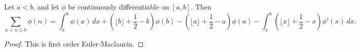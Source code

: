 \begin{lemma}
\label{sum_eq_int_deriv}
\leanok
Let $a < b$, and let $\phi$ be continuously differentiable on $[a, b]$.
  Then
  \[
  \sum_{a < n \le b} \phi(n) = \int_a^b \phi(x) \, dx
    + \left(\lfloor b \rfloor + \frac{1}{2} - b\right) \phi(b)
    - \left(\lfloor a \rfloor + \frac{1}{2} - a\right) \phi(a)
    - \int_a^b \left(\lfloor x \rfloor + \frac{1}{2} - x\right) \phi'(x) \, dx.
  \]
\end{lemma}
\begin{proof}
\leanok
This is first order Euler-Maclaurin.
\end{proof}
